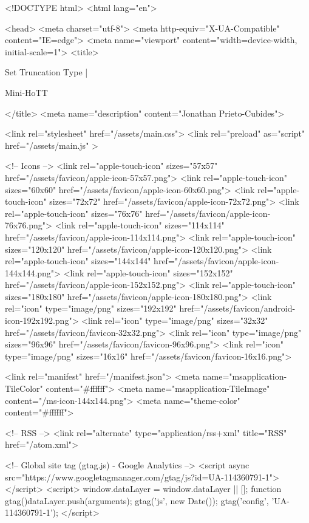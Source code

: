 <!DOCTYPE html>
<html lang="en">

<head>
  <meta charset="utf-8">
  <meta http-equiv="X-UA-Compatible" content="IE=edge">
  <meta name="viewport" content="width=device-width, initial-scale=1">
  <title>
    
      
        Set Truncation Type |
      
        Mini-HoTT
    
  </title>
  <meta name="description" content="Jonathan Prieto-Cubides">

  <link rel="stylesheet" href="/assets/main.css">
  <link rel="preload" as="script" href="/assets/main.js" >

  <!-- Icons -->
  <link rel="apple-touch-icon" sizes="57x57" href="/assets/favicon/apple-icon-57x57.png">
  <link rel="apple-touch-icon" sizes="60x60" href="/assets/favicon/apple-icon-60x60.png">
  <link rel="apple-touch-icon" sizes="72x72" href="/assets/favicon/apple-icon-72x72.png">
  <link rel="apple-touch-icon" sizes="76x76" href="/assets/favicon/apple-icon-76x76.png">
  <link rel="apple-touch-icon" sizes="114x114" href="/assets/favicon/apple-icon-114x114.png">
  <link rel="apple-touch-icon" sizes="120x120" href="/assets/favicon/apple-icon-120x120.png">
  <link rel="apple-touch-icon" sizes="144x144" href="/assets/favicon/apple-icon-144x144.png">
  <link rel="apple-touch-icon" sizes="152x152" href="/assets/favicon/apple-icon-152x152.png">
  <link rel="apple-touch-icon" sizes="180x180" href="/assets/favicon/apple-icon-180x180.png">
  <link rel="icon" type="image/png" sizes="192x192"  href="/assets/favicon/android-icon-192x192.png">
  <link rel="icon" type="image/png" sizes="32x32" href="/assets/favicon/favicon-32x32.png">
  <link rel="icon" type="image/png" sizes="96x96" href="/assets/favicon/favicon-96x96.png">
  <link rel="icon" type="image/png" sizes="16x16" href="/assets/favicon/favicon-16x16.png">

  <link rel="manifest" href="/manifest.json">
  <meta name="msapplication-TileColor" content="#ffffff">
  <meta name="msapplication-TileImage" content="/ms-icon-144x144.png">
  <meta name="theme-color" content="#ffffff">

  <!-- RSS -->
  <link rel="alternate" type="application/rss+xml" title="RSS" href="/atom.xml">

  <!-- Global site tag (gtag.js) - Google Analytics -->
  <script async src="https://www.googletagmanager.com/gtag/js?id=UA-114360791-1"></script>
  <script>
    window.dataLayer = window.dataLayer || [];
    function gtag(){dataLayer.push(arguments);}
    gtag('js', new Date());
    gtag('config', 'UA-114360791-1');
  </script>

